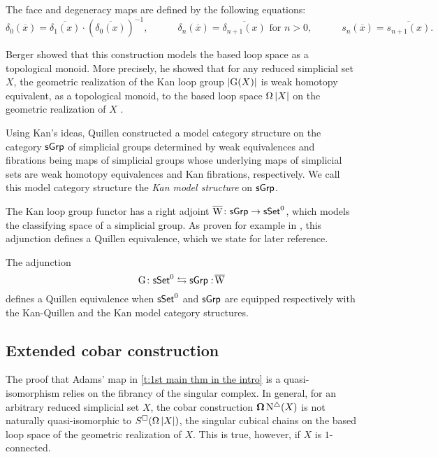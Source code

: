 The face and degeneracy maps are defined by the following equations:
\begin{equation*}
	\delta_0(\overline{x}) = \overline{\delta_1(x)} \cdot (\overline{\delta_0(x)})^{-1},
	\qquad \quad \delta_n(\overline{x}) = \overline{\delta_{n+1}(x)} \text{ for } n>0,
	\qquad \quad s_n(\overline{x}) = \overline{s_{n+1}(x)}.
\end{equation*}

Berger showed that this construction models the based loop space as a topological monoid.
More precisely, he showed that for any reduced simplicial set $X$, the geometric realization of the Kan loop group $\vert{\operatorname{G}(X)}\vert$ is weak homotopy equivalent, as a topological monoid, to the based loop space $\operatorname{\Omega}\vert{X}\vert$ on the geometric realization of $X$ \cite{berger1995loops}.

Using Kan's ideas, Quillen constructed a model category structure on the category $\mathsf{sGrp}$ of simplicial groups determined by
weak equivalences and fibrations being maps of simplicial groups whose underlying maps of simplicial sets are weak homotopy equivalences and Kan fibrations, respectively. 
We call this model category structure the \textit{Kan model structure} on $\mathsf{sGrp}$.

The Kan loop group functor has a right adjoint $\operatorname{\overline{W}} \colon \mathsf{sGrp} \to \mathsf{sSet}^0$, which models the classifying space of a simplicial group.
As proven for example in \cite[Chapter V]{goerss2009simplicial}, this adjunction defines a Quillen equivalence, which we state for later reference.

\begin{proposition} \label{p:kan adjuntion}
    The adjunction
	\begin{equation*}
	\operatorname{G} \colon \mathsf{sSet}^0 \leftrightarrows \mathsf{sGrp} :\! \operatorname{\overline{W}}
	\end{equation*}
	defines a Quillen equivalence when $\mathsf{sSet}^0$ and $\mathsf{sGrp}$ are equipped respectively with the Kan-Quillen and the Kan model category structures.
\end{proposition}

\subsection{Extended cobar construction}

The proof that Adams' map in \cref{t:1st main thm in the intro} is a quasi-isomorphism relies on the fibrancy of the singular complex.
In general, for an arbitrary reduced simplicial set $X$, the cobar construction $\operatorname{\mathbf{\Omega}} \operatorname{N^{\triangle}}(X)$ is not naturally quasi-isomorphic to $S^{\square}(\operatorname{\Omega}|X|)$, the singular cubical chains on the based loop space of the geometric realization of $X$.
This is true, however, if $X$ is $1$-connected.


